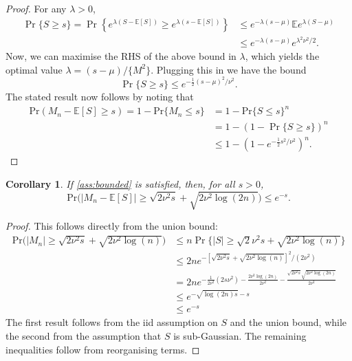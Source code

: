 \documentclass[a4paper,11pt]{article}
\newcommand{\E}{\mathbb{E}}
\newtheorem{corollary}{Corollary}
\begin{document}
\begin{proof}
	For any $\lambda>0$,
	\begin{align*}
		\Pr\{S\ge s\} =
		\Pr\left\{e^{\lambda (S-\E[S])}\ge e^{\lambda (s-\E[S])}\right\}
		 & \le e^{-\lambda(s-\mu)}\E e^{\lambda (S-\mu)} \\
		 & \le e^{-\lambda(s-\mu)}e^{\lambda^2\nu^2/2} .
	\end{align*}
	Now, we can maximise the RHS of the above bound in $\lambda$, which yields the optimal value $\lambda=(s-\mu)/\{M^2\}$. Plugging this in we have the bound
	$$
		\Pr\{S\ge s\}\le e^{-\frac{1}{2}(s-\mu)^2/\nu^2}.
	$$
	The stated result now follows by noting that
	\begin{align*}
		\mathrm{Pr}\left(M_n-\E[S]\ge s\right) = 1-\mathrm{Pr}\{M_n\le s\}
		 & = 1-\mathrm{Pr}\{S\le s\}^n                       \\
		 & = 1-(1-\Pr\{S\ge s\})^n                           \\
		 & \le 1-\left(1-e^{-\frac{1}{2}s^2/\nu^2}\right)^n.
	\end{align*}
\end{proof}
\begin{corollary}\label{cor:one}
	If \cref{ass:bounded} is satisfied, then, for all $s>0$,
	$$
		\mathrm{Pr}\Big(|M_n-\E[S]| \ge \sqrt{2\nu^2s} + \sqrt{2\nu^2\log(2n)}\Big) \le e^{-s}.
	$$
\end{corollary}
\begin{proof}
	This follows directly from the union bound:
	\begin{align*}
		\mathrm{Pr}\Big(|M_n|\ge \sqrt{2\nu^2s} + \sqrt{2\nu^2\log(n)}\Big)
		 & \le n \Pr\Big\{|S|\ge \sqrt{2}\nu^2s + \sqrt{2\nu^2\log(n)}\Big\}                                                     \\
		 & \le 2n e^{-[\sqrt{2\nu^2s}+\sqrt{2\nu^2\log(n)}]^2/(2\nu^2)}                                                          \\
		 & = 2n e^{-\frac{1}{2\nu^2}(2s\nu^2 )-\frac{2\nu^2\log(2n)}{2\nu^2}-\frac{\sqrt{2\nu^2s}\sqrt{2\nu^2\log(2n)}}{2\nu^2}} \\
		 & \le e^{-\sqrt{\log(2n)s}-s}                                                                                           \\
		 & \le e^{-s}
	\end{align*}
	The first result follows from the iid assumption on $S$ and the union bound, while the second from the assumption that $S$ is sub-Gaussian. The remaining inequalities follow from reorganising terms.
\end{proof}
\end{document}
